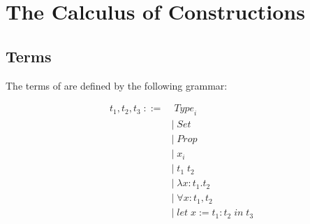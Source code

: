 


\section{The Calculus of Constructions}
\label{sec:coctype}


\subsection{Terms}

The terms of \coc{} are defined by the following grammar:

\begin{align*}
t_1, t_2, t_3 \; ::=& \; \mathit{Type}_i \\
&| \; \mathit{Set} \\
&| \; \mathit{Prop} \\
&| \; x_i \\
&| \; t_1 \; t_2 \\
&| \; \lambda x : t_1 . t_2 \\
&| \; \forall x : t_1 , t_2 \\
&| \; \mathit{let} \; x := t_1 : t_2 \; \mathit{in} \; t_3 \\
\end{align*}

